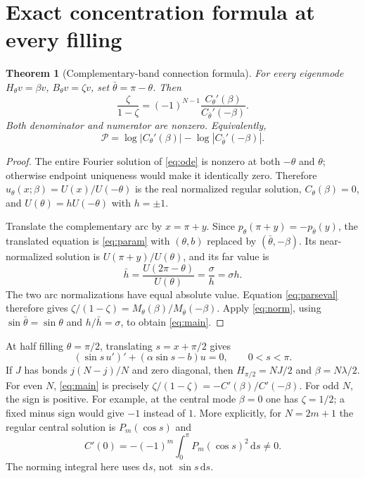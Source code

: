 \documentclass[10pt]{article}
\newtheorem{theorem}{Theorem}
\newcommand{\dd}{\mathrm d}
\begin{document}
\section{Exact concentration formula at every filling}
\begin{theorem}[Complementary-band connection formula]
For every eigenmode $H_\theta v=\beta v$, $B_\theta v=\zeta v$, set
$\bar\theta=\pi-\theta$. Then
\begin{equation}
\boxed{\quad
\frac{\zeta}{1-\zeta}
=(-1)^{N-1}\frac{C_\theta'(\beta)}{C_{\bar\theta}'(-\beta)}.
\quad} \label{eq:main}
\end{equation}
Both denominator and numerator are nonzero. Equivalently,
\begin{equation}
\mathcal P=\log|C_\theta'(\beta)|-\log|C_{\bar\theta}'(-\beta)|.
\label{eq:logC}
\end{equation}
\end{theorem}
\begin{proof}
The entire Fourier solution of \eqref{eq:ode} is nonzero at both
$-\theta$ and $\theta$; otherwise endpoint uniqueness would make it
identically zero. Therefore
$u_\theta(x;\beta)=U(x)/U(-\theta)$ is the real normalized regular
solution, $C_\theta(\beta)=0$, and $U(\theta)=hU(-\theta)$ with $h=\pm1$.

Translate the complementary arc by $x=\pi+y$. Since
$p_\theta(\pi+y)=-p_{\bar\theta}(y)$, the translated equation is
\eqref{eq:param} with $(\theta,b)$ replaced by $(\bar\theta,-\beta)$.
Its near-normalized solution is $U(\pi+y)/U(\theta)$, and its far value is
\[
\bar h=\frac{U(2\pi-\theta)}{U(\theta)}
=\frac{\sigma}{h}=\sigma h.
\]
The two arc normalizations have equal absolute value.
Equation \eqref{eq:parseval} therefore gives
$\zeta/(1-\zeta)=M_\theta(\beta)/M_{\bar\theta}(-\beta)$.
Apply \eqref{eq:norm}, using $\sin\bar\theta=\sin\theta$ and
$h/\bar h=\sigma$, to obtain \eqref{eq:main}.
\end{proof}

At half filling $\theta=\pi/2$, translating $s=x+\pi/2$ gives
\[
(\sin s\,u')'+(\alpha\sin s-b)u=0,\qquad 0<s<\pi.
\]
If $J$ has bonds $j(N-j)/N$ and zero diagonal, then
$H_{\pi/2}=NJ/2$ and $\beta=N\lambda/2$.
For even $N$, \eqref{eq:main} is precisely
$\zeta/(1-\zeta)=-C'(\beta)/C'(-\beta)$.
For odd $N$, the sign is positive. For example, at the central mode
$\beta=0$ one has $\zeta=1/2$; a fixed minus sign would give $-1$
instead of $1$. More explicitly, for $N=2m+1$ the regular central
solution is $P_m(\cos s)$ and
\begin{equation}
C'(0)=-(-1)^m\int_0^\pi P_m(\cos s)^2\,\dd s\ne0.
\label{eq:central}
\end{equation}
The norming integral here uses $\dd s$, not $\sin s\,\dd s$.
\end{document}
